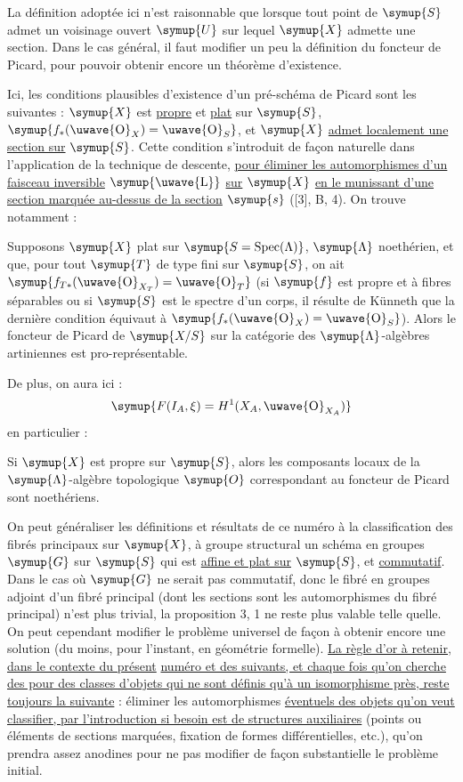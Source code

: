  La définition adoptée ici n'est raisonnable que lorsque
tout point de $\symup{S}$ admet un voisinage
ouvert $\symup{U}$ sur lequel $\symup{X}$ admette une section. Dans le cas général, il faut
modifier un peu la définition du foncteur de Picard, pour pouvoir obtenir
encore un théorème d'existence.

Ici, les conditions plausibles d'existence d'un pré-schéma de Picard sont les
suivantes : $\symup{X}$ est \uline{propre} et \uline{plat} sur $\symup{S}$, $\symup{f_*(\text{\uwave{O}}_X)=\text{\uwave{O}}_S}$,
et $\symup{X}$ \uline{admet localement une section sur} $\symup{S}$. Cette condition s'introduit de
façon naturelle dans l'application de la technique de descente, \uline{pour éliminer
les automorphismes d'un faisceau inversible} $\symup{\text{\uwave{L}}}$ \uline{sur} $\symup{X}$ \uline{en le munissant d'une
section marquée au-dessus de la section} $\symup{s}$ ([3], B, 4). On trouve notamment :

 Supposons $\symup{X}$ plat sur
$\symup{S=\operatorname{Spec}(\Lambda)}$, $\symup{\Lambda}$ noethérien, et que, pour tout $\symup{T}$
de type fini sur $\symup{S}$, on ait $\symup{f_{T*}(\text{\uwave{O}}_{X_T})=\text{\uwave{O}}_T}$ (si $\symup{f}$ est propre et à
fibres séparables ou si $\symup{S}$ est le
spectre d'un corps, il résulte de Künneth que la dernière condition équivaut à
$\symup{f_*(\text{\uwave{O}}_X)=\text{\uwave{O}}_S}$). Alors le foncteur de Picard de $\symup{X/S}$ sur la
catégorie des $\symup{\Lambda}$-algèbres artiniennes est pro-représentable.

De plus, on aura ici :
\[
  \symup{F(I_A,\xi)=H^1(X_A,\text{\uwave{O}}_{X_A})}
\]
en particulier :

 Si $\symup{X}$ est propre sur $\symup{S}$, alors les composants locaux
de la $\symup{\Lambda}$-algèbre topologique $\symup{O}$ correspondant au foncteur de Picard
sont noethériens.

 On peut généraliser les définitions et résultats de ce
numéro à la classification des fibrés principaux sur $\symup{X}$, à groupe structural
un schéma en groupes $\symup{G}$ sur $\symup{S}$ qui est \uline{affine et plat sur} $\symup{S}$, et
\uline{commutatif}. Dans le cas où $\symup{G}$ ne serait pas commutatif, donc le fibré en
groupes adjoint d'un fibré principal (dont les sections sont les
automorphismes du fibré principal) n'est plus trivial, la proposition 3, 1 ne
reste plus valable telle quelle. On peut cependant modifier le problème
universel de façon à obtenir encore une solution (du moins, pour l'instant, en
géométrie formelle). \uline{La règle d'or à retenir, dans le contexte du présent}
\uline{numéro et des suivants, et chaque fois qu'on cherche des 
pour des classes d'objets qui ne sont définis qu'à un isomorphisme près, reste
toujours la suivante} : éliminer les automorphismes \uline{éventuels des objets qu'on
veut classifier, par l'introduction si besoin est de structures auxiliaires}
(points ou éléments de sections marquées, fixation de formes différentielles,
etc.), qu'on prendra assez anodines pour ne pas modifier de façon substantielle
le problème initial.

